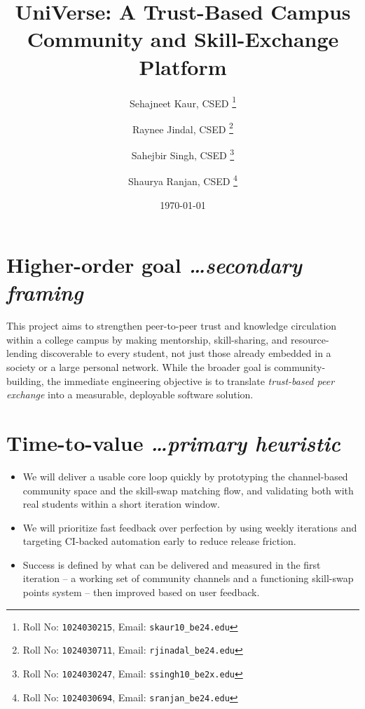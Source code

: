 \documentclass[11pt,a4paper]{article}
\title{UniVerse: A Trust-Based Campus Community and Skill-Exchange Platform}
\author{
  Sehajneet Kaur, CSED%
  \thanks{Roll No: \texttt{1024030215}, %
    Email: \texttt{skaur10\_be24\@thapar.edu}}
  \and 
  Raynee Jindal, CSED%
  \thanks{Roll No: \texttt{1024030711}, %
    Email: \texttt{rjinadal\_be24\@thapar.edu}}
  \and
  Sahejbir Singh, CSED%
  \thanks{Roll No: \texttt{1024030247}, %
    Email: \texttt{ssingh10\_be2x\@thapar.edu}}
  \and
  Shaurya Ranjan, CSED%
  \thanks{Roll No: \texttt{1024030694}, %
    Email: \texttt{sranjan\_be24\@thapar.edu}}
}
\date{\today}
\newcommand{\BvrHint}[1]{%
  {\normalfont\normalsize\itshape\hfill #1}}
\begin{document}
\maketitle

\section{Higher-order goal%
  \BvrHint{\ldots secondary framing}}
This project aims to strengthen peer-to-peer trust and knowledge circulation within a college campus by making mentorship, skill-sharing, and resource-lending discoverable to every student, not just those already embedded in a society or a large personal network. While the broader goal is community-building, the immediate engineering objective is to translate \emph{trust-based peer exchange} into a measurable, deployable software solution.

\section{Time-to-value %
\BvrHint{\ldots primary heuristic}}
\begin{itemize}[leftmargin=0.7cm]
    \item We will deliver a usable core loop quickly by prototyping the channel-based community space and the skill-swap matching flow, and validating both with real students within a short iteration window.
    \item We will prioritize fast feedback over perfection by using weekly iterations and targeting CI-backed automation early to reduce release friction.
    \item Success is defined by what can be delivered and measured in the first iteration -- a working set of community channels and a functioning skill-swap points system -- then improved based on user feedback.
\end{itemize}
\end{document}
